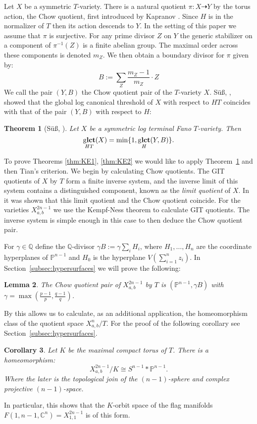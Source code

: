 \documentclass{amsart}
\newtheorem{theorem}{Theorem}[section]
\newtheorem{lemma}[theorem]{Lemma}
\newtheorem{corollary}[theorem]{Corollary}
{\theoremstyle{remark}
\newtheorem{remark}[theorem]{Remark}
\newtheorem{remarks}[theorem]{Remarks}
\newtheorem{notation}[theorem]{Notation}
}
\theoremstyle{definition}
\newcommand{\CC}{\mathbb{C}}
\newcommand{\QQ}{\mathbb{Q}}
\newcommand{\PP}{\mathbb{P}}
\DeclareMathOperator{\glct}{g\bf{lct}}
\begin{document}
Let \(X\) be a symmetric \(T\)-variety. There is a natural quotient \(\pi:X \dashrightarrow Y\) by the torus action, the Chow quotient, first introduced by Kapranov \cite{kapranov1993}. Since \(H\) is in the normalizer of \(T\) then its action descends to \(Y\). In the setting of this paper we assume that \(\pi\) is surjective. For any prime divisor \(Z\) on \(Y\) the generic stabilizer on a component of \(\pi^{-1}(Z)\) is a finite abelian group. The maximal order across these components is denoted \(m_Z\). We then obtain a boundary divisor for \(\pi\) given by:
\begin{equation} \label{boundary}
B := \sum_Z \frac{m_Z-1}{m_Z} \cdot Z
\end{equation}
We call the pair \((Y,B)\) the Chow quotient pair of the \(T\)-variety \(X\). S{\"u}{\ss}, \cite{Su13}, showed that the global log canonical threshold of \(X\) with respect to \(HT\) coincides with that of the pair \((Y,B)\) with respect to \(H\):
\begin{theorem}[S{\"u}{\ss}, {\cite[Theorem 1.2]{Su13}}]\label{thm:SU}
Let \(X\) be a symmetric log terminal Fano \(T\)-variety. Then
\[
\glct_{HT}(X) = \min \{1, \glct_H(Y,B) \}.
\]
\end{theorem}
%
%
%
%
%
%
To prove Theorems \ref{thm:KE1}, \ref{thm:KE2} we would like to apply Theorem~\ref{thm:SU} and then Tian's criterion. We begin by calculating Chow quotients. The GIT quotients of \(X\) by \(T\) form a finite inverse system, and the inverse limit of this system contains a distinguished component, known as the \textit{limit quotient} of \(X\). In \cite{baker2012} it was shown that this limit quotient and the Chow quotient coincide. For the varieties \(X_{a,b}^{2n-1}\) we use the Kempf-Ness theorem to calculate GIT quotients. The inverse system is simple enough in this case to then deduce the Chow quotient pair.

For \(\gamma \in \QQ\) define the \(\QQ\)-divisor \(\gamma B := \gamma \sum_i H_i\), where \(H_1,\dots,H_n\) are the coordinate hyperplanes of \(\PP^{n-1}\) and \(H_0\) is the hyperplane \(V( \sum_{i=1}^n z_i)\). In Section~\ref{subsec:hypersurfaces} we will prove the following:
\begin{lemma}\label{lem:1.4}
The Chow quotient pair of \(X_{a,b}^{2n-1}\) by \(T\) is \((\PP^{n-1},\gamma B)\) with \(\gamma = \max \left(\frac{p-1}{p}, \frac{q - 1}{q} \right)\).
\end{lemma}
%
%
%
%
%
%
By \cite[Proposition 2.6]{suess18-2} this allows us to calculate, as an additional application, the homeomorphism class of the quotient space \(X_{a,b}^n/T\). For the proof of the following corollary see Section~\ref{subsec:hypersurfaces}.
\begin{corollary}\label{cor:topquot}
Let \(K\) be the maximal compact torus of \(T\). There is a homeomorphism:
\[
X_{a,b}^{2n-1}/K \cong S^{n-1} \ast \PP^{n-1}.
\]
Where the later is the topological join of the \((n-1)\)-sphere and complex projective \((n-1)\)-space. 
\end{corollary}
In particular, this shows that the \(K\)-orbit space of the flag manifolds \(F(1,n-1,\CC^n) = X_{1,1}^{2n-1}\) is of this form.
\end{document}
